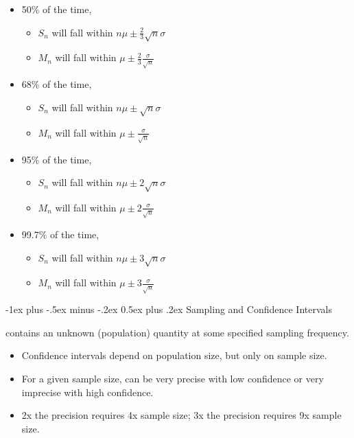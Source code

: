 \documentclass[10pt,landscape]{article}
\makeatletter
\renewcommand{\section}{\@startsection{section}{1}{0mm}%
                                {-1ex plus -.5ex minus -.2ex}%
                                {0.5ex plus .2ex}%
                                {\normalfont\large\bfseries}}
\newcommand{\Red}[1]{\noindent{\textbf{\textcolor{BrickRed}{#1 -}}}}
\newcommand{\Green}[1]{\noindent{\textbf{\textcolor{PineGreen}{#1 -}}}}
\newcommand{\Hint}[1]{\noindent{\textcolor{Orange}{#1}}}
\makeatother
\begin{document}
\begin{multicols}{4}
\Green{Emperical Rules under CLT}
\begin{itemize}
    \item 50\% of the time,\begin{itemize}
        \item $S_n$ will fall within $n\mu \pm \frac{2}{3}\sqrt{n} \sigma$
        \item $M_n$ will fall within $\mu \pm \frac{2}{3}\frac{\sigma}{\sqrt{n}}$
    \end{itemize}
    \item 68\% of the time,\begin{itemize}
        \item $S_n$ will fall within $n\mu \pm \sqrt{n} \sigma$
        \item $M_n$ will fall within $\mu \pm \frac{\sigma}{\sqrt{n}}$
    \end{itemize}
    \item 95\% of the time,\begin{itemize}
        \item $S_n$ will fall within $n\mu \pm 2\sqrt{n} \sigma$
        \item $M_n$ will fall within $\mu \pm 2\frac{\sigma}{\sqrt{n}}$
    \end{itemize}
    \item 99.7\% of the time,\begin{itemize}
        \item $S_n$ will fall within $n\mu \pm 3\sqrt{n} \sigma$
        \item $M_n$ will fall within $\mu \pm 3\frac{\sigma}{\sqrt{n}}$
    \end{itemize}
\end{itemize}

\section{Sampling and Confidence Intervals}

\Red{Confidence Interval} contains an unknown (population) quantity at some specified sampling frequency.
\begin{itemize}
    \item Confidence intervals \Hint{do not} depend on population size, but only on sample size.
    \item For a given sample size, can be very precise with low confidence or very imprecise with high confidence.
    \item 2x the precision requires 4x sample size; 3x the precision requires 9x sample size.
\end{itemize}


\end{multicols}
\end{document}
